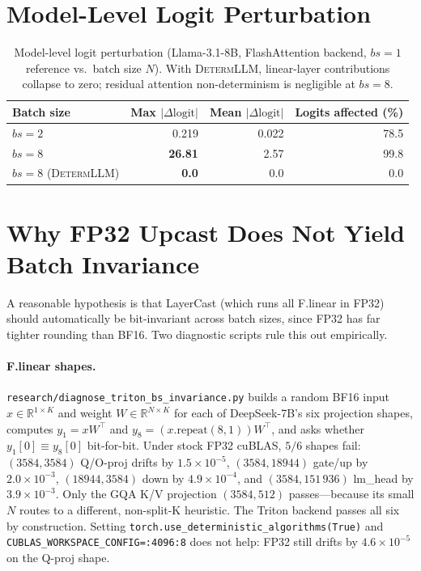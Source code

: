 \documentclass{article}
\newcommand{\dllm}{\textsc{DetermLLM}\xspace}
\begin{document}
\section{Model-Level Logit Perturbation}
\label{app:logit_error}

\begin{table}[h]
\centering
\caption{Model-level logit perturbation (Llama-3.1-8B, FlashAttention backend,
  $bs\!=\!1$ reference vs.\ batch size $N$).  With \dllm, linear-layer contributions
  collapse to zero; residual attention non-determinism is negligible at $bs\!=\!8$.}
\label{tab:logit_error}
\begin{tabular}{lrrr}
\toprule
Batch size & Max $|\Delta\text{logit}|$ & Mean $|\Delta\text{logit}|$ & Logits affected (\%) \\
\midrule
$bs=2$ & 0.219          & 0.022 & 78.5 \\
$bs=8$ & \textbf{26.81} & 2.57  & 99.8 \\
$bs=8$ (\dllm) & \textbf{0.0} & 0.0 & 0.0 \\
\bottomrule
\end{tabular}
\end{table}

\section{Why FP32 Upcast Does Not Yield Batch Invariance}
\label{app:fp32insufficient}

A reasonable hypothesis is that LayerCast (which runs all F.linear in
FP32) should automatically be bit-invariant across batch sizes, since
FP32 has far tighter rounding than BF16. Two diagnostic scripts rule
this out empirically.

\paragraph{F.linear shapes.}
\texttt{research/diagnose\_triton\_bs\_invariance.py} builds a random
BF16 input $x\!\in\!\mathbb{R}^{1\times K}$ and weight
$W\!\in\!\mathbb{R}^{N\times K}$ for each of DeepSeek-7B's six
projection shapes, computes $y_1\!=\!xW^\top$ and
$y_8\!=\!(x\text{.repeat}(8,1))W^\top$, and asks whether
$y_1[0]\!\equiv\!y_8[0]$ bit-for-bit. Under stock FP32 cuBLAS,
$5/6$ shapes fail: $(3584, 3584)$ Q/O-proj drifts by
$1.5\!\times\!10^{-5}$, $(3584, 18944)$ gate/up by
$2.0\!\times\!10^{-3}$, $(18944, 3584)$ down by $4.9\!\times\!10^{-4}$,
and $(3584, 151\,936)$ lm\_head by $3.9\!\times\!10^{-3}$. Only the
GQA K/V projection $(3584, 512)$ passes---because its small $N$ routes
to a different, non-split-K heuristic. The Triton backend passes all
six by construction. Setting
\texttt{torch.use\_deterministic\_algorithms(True)} and
\texttt{CUBLAS\_WORKSPACE\_CONFIG=:4096:8} does not help: FP32 still
drifts by $4.6\!\times\!10^{-5}$ on the Q-proj shape.
\end{document}
